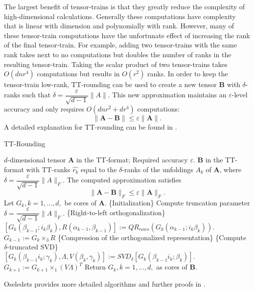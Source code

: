 The largest benefit of tensor-trains is that they greatly reduce the complexity of high-dimensional calculations. Generally these computations have complexity that is linear with dimension and polynomially with rank. However, many of these tensor-train computations have the unfortunate effect of increasing the rank of the final tensor-train. For example, adding two tensor-trains with the same rank takes next to no computations but doubles the number of ranks in the resulting tensor-train. Taking the scalar product of two tensor-trains takes $O(dnr^4)$ computations but results in $O(r^2)$ ranks. In order to keep the tensor-train low-rank, TT-rounding can be used to create a new tensor $\textbf{B}$ with $\delta$-ranks such that $\delta = \dfrac{\varepsilon}{\sqrt{d-1}}\| A\|$. This new approximation maintains an $\varepsilon$-level accuracy and only requires $O(dnr^2+dr^4)$ computations:
\begin{equation}
\| \textbf{A}-\textbf{B}\| \leq \varepsilon \| \textbf{A} \|.
\end{equation}
A detailed explanation for TT-rounding can be found in  \cite{Osel1}.
\begin{algorithm}
\caption{TT-Rounding \cite{Osel1}}\label{ttround}
\begin{algorithmic}[1]
	\Require $d$-dimensional tensor \textbf{A} in the TT-format; Required accuracy $\varepsilon$.
	\Ensure \textbf{B} in the TT-format with TT-ranks $\hat{r_k}$ equal to the $\delta$-ranks of the unfoldings $A_k$ of \textbf{A}, where $\delta = \dfrac{\varepsilon}{\sqrt{d-1}}\|A\|_F.$ The computed approximation satisfies
	\begin{equation*}
	\| \textbf{A}-\textbf{B}\|_F \leq \varepsilon\|\textbf{A}\|_F.
	\end{equation*}
	\State Let $G_k, k = 1,...,d,$ be cores of \textbf{A}. 
	\State \{Initialization\}
	\Statex	Compute truncation parameter $\delta = \dfrac{\varepsilon}{\sqrt{d-1}}\|A\|_F.$
	\State \{Right-to-left orthogonalization\} 
	 \do{}
		\State $[G_k(\beta_{k-1};i_k\beta_k),R(\alpha_{k-1},\beta_{k-1})] := QR_{rows}(G_k(\alpha_{k-1};i_k\beta_k)).$
		\State $G_{k-1} := G_k \times_3 R$
	\EndFor
	\State \{Compression of the orthogonalized representation\}
	 \do{}
		\State \{Compute $\delta$-truncated SVD\}
		\Statex $[G_k(\beta_{k-1}i_k;\gamma_k),\Lambda,V(\beta_k,\gamma_k)] := SVD_\delta[G_k(\beta_{k-1}i_k;\beta_k)].$
		\State $G_{k+1} := G_{k+1} \times_1 (V\Lambda)^T$
	\EndFor
	\State Return $G_k, k = 1,...,d,$ as cores of \textbf{B}.
\end{algorithmic}
\end{algorithm}

Oseledets provides more detailed algorithms and further proofs in \cite{Osel1,Osel2}.